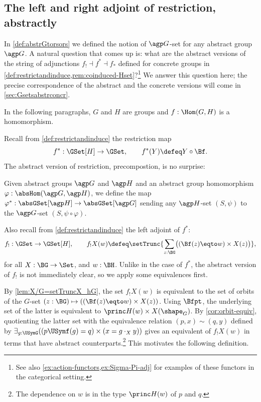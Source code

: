 
\subsection{The left and right adjoint of restriction, abstractly}
\label{sec:phi-functors}
In \cref{def:abstrGtorsors} we defined the notion of $\agp G$-set
for any abstract group $\agp G$. A natural question that comes
up is: what are the abstract versions of the string of adjunctions
$f_!\dashv f^*\dashv f_*$ defined for concrete groups in 
\cref{def:restrictandinduce,rem:coinduced-Hset}?\footnote{%
See also \cref{ex:action-functors,ex:Sigma-Pi-adj}
for examples of these functors in the categorical setting.}
We answer this question here; the precise correspondence of the 
abstract and the concrete versions will come in \cref{sec:Gsetsabstrconcr}.

In the following paragraphs, $G$ and $H$ are groups and $f:\Hom(G,H)$ 
is a homomorphism.

Recall from \cref{def:restrictandinduce} the restriction map
\[
f^*: \GSet[H]\to\GSet, \qquad f^*(Y) \defeq Y\circ \Bf.
\]
The abstract version of restriction, \ie precompostion, is no surprise:

\begin{definition}\label{def:phi^*}
Given abstract groups $\agp G$ and $\agp H$
and an abstract group homomorphism $\varphi : \absHom(\agp G, \agp H)$,
we define  the map $\varphi^*: \absGSet[\agp H] \to \absGSet[\agp G]$ sending
any $\agp H$-set $(S,\psi)$ to the $\agp G$-set $(S,\psi\circ\varphi)$.
\end{definition}

Also recall from \cref{def:restrictandinduce} the left adjoint of $f^*$: 
\[
f_!: \GSet\to\GSet[H], \qquad f_!X(w)\defeq
\setTrunc{\sum_{z:\BG}\bigl((\Bf(z) \eqto w)\times X(z)\bigr)},
\] 
for all $X:\BG\to\Set$, and $w:\BH$.
Unlike in the case of $f^*$, 
the abstract version of $f_!$ is not immediately clear,
so we apply some equivalences first.

By \cref{lem:X/G=setTruncX_hG}, the set $f_!X(w)$ 
is equivalent to the set of orbits
of the $G$-set $(z:\BG)\mapsto((\Bf(z) \eqto w)\times X(z))$. 
Using $\Bfpt$, the underlying set of the latter is equivalent to
$\princ H(w)\times X(\sh_G)$. By \cref{cor:orbit-equiv},
quotienting the latter set with the equivalence
relation $(p,x)\sim(q,y)$ defined by
$\exists_{g:\USymG}((p\USymf(g)=q)\times(x = g\cdot_X y))$ gives an 
equivalent of $f_!X(w)$ in terms that have abstract counterparts.\footnote{%
The dependence on $w$ is in the type $\princ H(w)$ of $p$ and $q$.}
This motivates the following definition.

